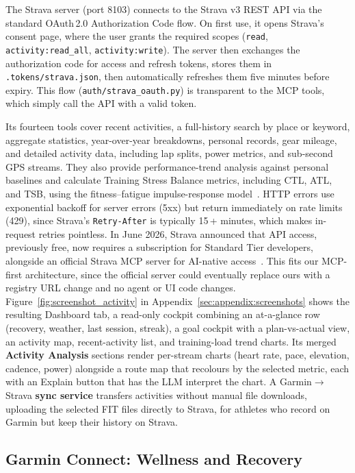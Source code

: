 The Strava server (port 8103) connects to the Strava v3 REST API via the standard OAuth\,2.0 Authorization Code flow. On first use, it opens Strava's consent page, where the user grants the required scopes (\texttt{read}, \texttt{activity:read\_all}, \texttt{activity:write}). The server then exchanges the authorization code for access and refresh tokens, stores them in \texttt{.tokens/strava.json}, then automatically refreshes them five minutes before expiry. This flow (\texttt{auth/strava\_oauth.py}) is transparent to the MCP tools, which simply call the API with a valid token.

Its fourteen tools cover recent activities, a full-history search by place or keyword, aggregate statistics, year-over-year breakdowns, personal records, gear mileage, and detailed activity data, including lap splits, power metrics, and sub-second GPS streams. They also provide performance-trend analysis against personal baselines and calculate Training Stress Balance metrics, including CTL, ATL, and TSB, using the fitness–fatigue impulse-response model~\citep{morton_modeling_1990}. HTTP errors use exponential backoff for server errors (5xx) but return immediately on rate limits (429), since Strava's \texttt{Retry-After} is typically 15\,+ minutes, which makes in-request retries pointless. In June 2026, Strava announced that API access, previously free, now requires a subscription for Standard Tier developers, alongside an official Strava MCP server for AI-native access~\citep{strava_api_update_2026}. This fits our MCP-first architecture, since the official server could eventually replace ours with a registry URL change and no agent or UI code changes. Figure~\ref{fig:screenshot_activity} in Appendix~\ref{sec:appendix:screenshots} shows the resulting Dashboard tab, a read-only cockpit combining an at-a-glance row (recovery, weather, last session, streak), a goal cockpit with a plan-vs-actual view, an activity map, recent-activity list, and training-load trend charts. Its merged \textbf{Activity Analysis} sections render per-stream charts (heart rate, pace, elevation, cadence, power) alongside a route map that recolours by the selected metric, each with an Explain button that has the LLM interpret the chart. A Garmin$\to$Strava \textbf{sync service} transfers activities without manual file downloads, uploading the selected FIT files directly to Strava, for athletes who record on Garmin but keep their history on Strava.

\subsection{Garmin Connect: Wellness and Recovery}\label{sec:data:garmin}


